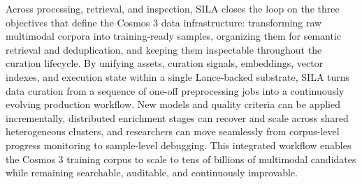 Across processing, retrieval, and inspection, SILA closes the loop on the three objectives that define the Cosmos 3 data infrastructure: transforming raw multimodal corpora into training-ready samples, organizing them for semantic retrieval and deduplication, and keeping them inspectable throughout the curation lifecycle. By unifying assets, curation signals, embeddings, vector indexes, and execution state within a single Lance-backed substrate, SILA turns data curation from a sequence of one-off preprocessing jobs into a continuously evolving production workflow. New models and quality criteria can be applied incrementally, distributed enrichment stages can recover and scale across shared heterogeneous clusters, and researchers can move seamlessly from corpus-level progress monitoring to sample-level debugging. This integrated workflow enables the Cosmos 3 training corpus to scale to tens of billions of multimodal candidates while remaining searchable, auditable, and continuously improvable.
